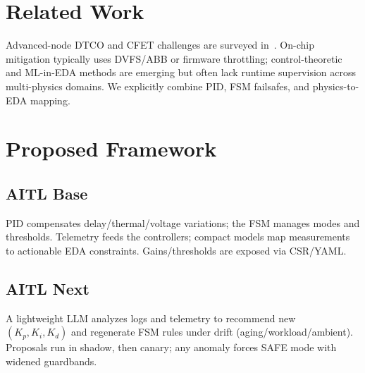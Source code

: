 \documentclass[conference]{IEEEtran}
\begin{document}
\section{Related Work}
Advanced-node DTCO and CFET challenges are surveyed in~\cite{yakimets,irds}. On-chip mitigation typically uses DVFS/ABB or firmware throttling; control-theoretic and ML-in-EDA methods are emerging but often lack runtime supervision across multi-physics domains. We explicitly combine PID, FSM failsafes, and physics-to-EDA mapping.

\section{Proposed Framework}
\subsection{AITL Base}
PID compensates delay/thermal/voltage variations; the FSM manages modes and thresholds. Telemetry feeds the controllers; compact models map measurements to actionable EDA constraints. Gains/thresholds are exposed via CSR/YAML.

\subsection{AITL Next}
A lightweight LLM analyzes logs and telemetry to recommend new $(K_p,K_i,K_d)$ and regenerate FSM rules under drift (aging/workload/ambient). Proposals run in shadow, then canary; any anomaly forces SAFE mode with widened guardbands.
\end{document}
